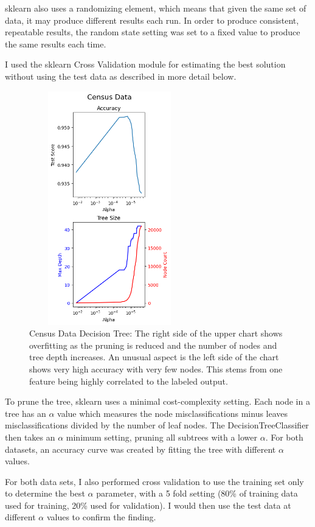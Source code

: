 \documentclass[letterpaper]{article} %
\begin{document}
sklearn also uses a randomizing element, which means that given the same set of data, it may produce different results each run.  In order to produce consistent, repeatable results, the random state setting was set to a fixed value to produce the same results each time.

I used the sklearn Cross Validation module for estimating the best solution without using the test data as described in more detail below.



\begin{figure}[h]
\centering
\includegraphics[width=2.75in, height=4in]{figures/Census_Data_decision_tree.png}
\caption{Census Data Decision Tree:  The right side of the upper chart shows overfitting as the pruning is reduced and the number of nodes and tree depth increases.  An unusual aspect is the left side of the chart shows very high accuracy with very few nodes.  This stems from one feature being highly correlated to the labeled output.}
\label{fig:census_data_decision_tree}
\end{figure}

To prune the tree, sklearn uses a minimal cost-complexity setting.  Each node in a tree has an $\alpha$ value which measures the node misclassifications minus leaves misclassifications divided by the number of leaf nodes.  The DecisionTreeClassifier then takes an $\alpha$ minimum setting, pruning all subtrees with a lower $\alpha$.   For both datasets, an accuracy curve was created by fitting the tree with different $\alpha$ values.  

For both data sets, I also performed cross validation to use the training set only to determine the best $\alpha$ parameter, with a 5 fold setting (80\% of training data used for training, 20\% used for validation).  I would then use the test data at different $\alpha$ values to confirm the finding.
\end{document}
